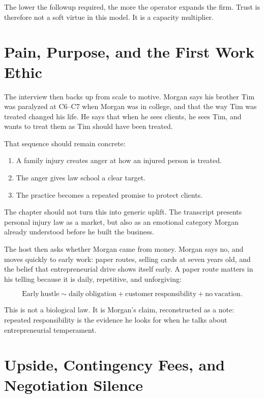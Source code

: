 The lower the followup required, the more the operator expands the firm. Trust is therefore not a soft virtue in this model. It is a capacity multiplier.

\section{Pain, Purpose, and the First Work Ethic}

The interview then backs up from scale to motive. Morgan says his brother Tim was paralyzed at C6--C7 when Morgan was in college, and that the way Tim was treated changed his life. He says that when he sees clients, he sees Tim, and wants to treat them as Tim should have been treated.

That sequence should remain concrete:

\begin{enumerate}
\item A family injury creates anger at how an injured person is treated.
\item The anger gives law school a clear target.
\item The practice becomes a repeated promise to protect clients.
\end{enumerate}

The chapter should not turn this into generic uplift. The transcript presents personal injury law as a market, but also as an emotional category Morgan already understood before he built the business.

The host then asks whether Morgan came from money. Morgan says no, and moves quickly to early work: paper routes, selling cards at seven years old, and the belief that entrepreneurial drive shows itself early. A paper route matters in his telling because it is daily, repetitive, and unforgiving:

\begin{equation}
\mathrm{Early\ hustle}
\sim
\mathrm{daily\ obligation}
+
\mathrm{customer\ responsibility}
+
\mathrm{no\ vacation}.
\end{equation}

This is not a biological law. It is Morgan's claim, reconstructed as a note: repeated responsibility is the evidence he looks for when he talks about entrepreneurial temperament.

\section{Upside, Contingency Fees, and Negotiation Silence}

